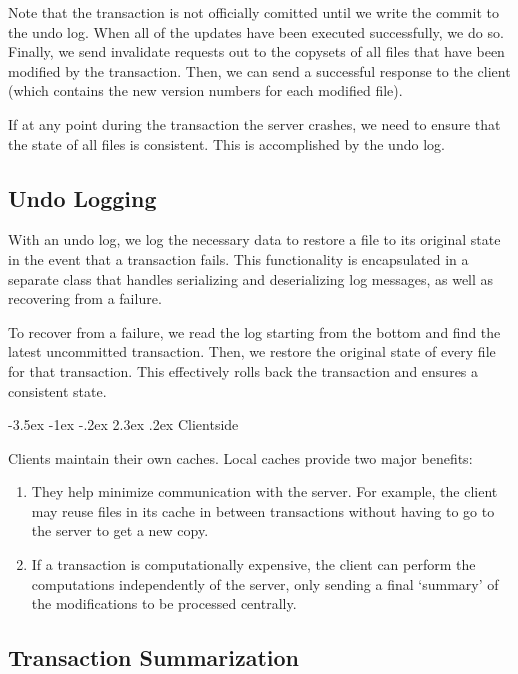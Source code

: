 \documentclass[12pt]{article}
\makeatletter
\renewcommand\section{\@startsection{section}{1}{\z@}%
								 {-3.5ex \@plus -1ex \@minus -.2ex}%
								 {2.3ex \@plus.2ex}%
								 {\normalfont\large\bfseries}}
\makeatother
\begin{document}
Note that the transaction is not officially comitted until we write the commit to the undo log. When all of the updates have been executed successfully, we do so. Finally, we send invalidate requests out to the copysets of all files that have been modified by the transaction. Then, we can send a successful response to the client (which contains the new version numbers for each modified file).

If at any point during the transaction the server crashes, we need to ensure that the state of all files is consistent. This is accomplished by the undo log.

\subsection{Undo Logging}

With an undo log, we log the necessary data to restore a file to its original state in the event that a transaction fails. This functionality is encapsulated in a separate class that handles serializing and deserializing log messages, as well as recovering from a failure.

To recover from a failure, we read the log starting from the bottom and find the latest uncommitted transaction. Then, we restore the original state of every file for that transaction. This effectively rolls back the transaction and ensures a consistent state.

\section{Clientside}

Clients maintain their own caches. Local caches provide two major benefits:
\begin{enumerate}
\item They help minimize communication with the server. For example, the client may reuse files in its cache in between transactions without having to go to the server to get a new copy.
\item If a transaction is computationally expensive, the client can perform the computations independently of the server, only sending a final `summary' of the modifications to be processed centrally.
\end{enumerate}

\subsection{Transaction Summarization}
\end{document}
